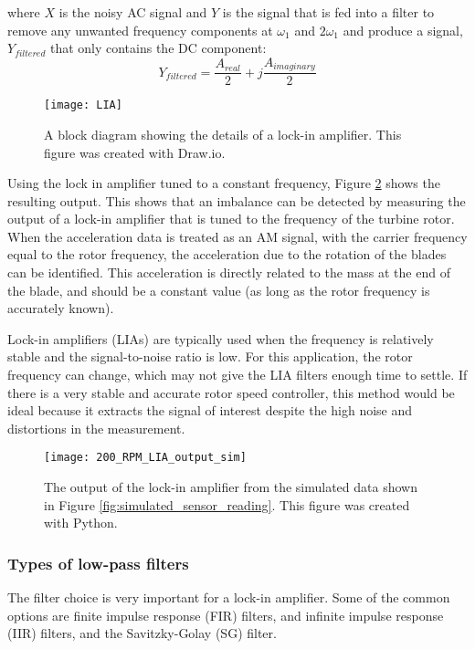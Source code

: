 where $X$ is the noisy AC signal and $Y$ is the signal that is fed into a filter to remove any unwanted frequency components at $\omega_1$ and $2 \omega_1$ and produce a signal, $Y_{filtered}$ that only contains the DC component:
\begin{equation}
	Y_{filtered} = \frac{A_{real}}{2} + j \frac{A_{imaginary}}{2}
\end{equation}

\begin{figure}
	\centering
	\texttt{[image: LIA]}
	\decoRule
	\caption{A block diagram showing the details of a lock-in amplifier.  This figure was created with Draw.io.}
	\label{fig:LIA}
\end{figure}

Using the lock in amplifier tuned to a constant frequency, Figure \ref{fig:200_RPM_LIA_output_sim} shows the resulting output.  This shows that an imbalance can be detected by measuring the output of a lock-in amplifier that is tuned to the frequency of the turbine rotor.  When the acceleration data is treated as an AM signal, with the carrier frequency equal to the rotor frequency, the acceleration due to the rotation of the blades can be identified.  This acceleration is directly related to the mass at the end of the blade, and should be a constant value (as long as the rotor frequency is accurately known).

Lock-in amplifiers (LIAs) are typically used when the frequency is relatively stable and the signal-to-noise ratio is low.  For this application, the rotor frequency can change, which may not give the LIA filters enough time to settle.  If there is a very stable and accurate rotor speed controller, this method would be ideal because it extracts the signal of interest despite the high noise and distortions in the measurement.

\begin{figure}
	\centering
	\texttt{[image: 200\_RPM\_LIA\_output\_sim]}
	\decoRule
	\caption{The output of the lock-in amplifier from the simulated data shown in Figure \ref{fig:simulated_sensor_reading}.  This figure was created with Python.}
	\label{fig:200_RPM_LIA_output_sim}
\end{figure}


\subsubsection{Types of low-pass filters}
The filter choice is very important for a lock-in amplifier.  Some of the common options are finite impulse response (FIR) filters, and infinite impulse response (IIR) filters, and the Savitzky-Golay (SG) filter.

